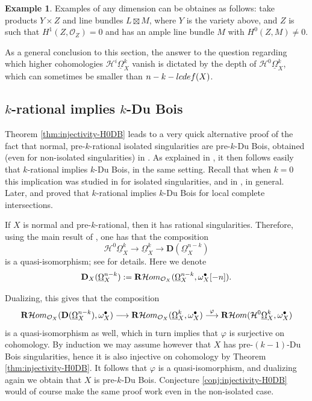 \documentclass[11pt]{amsart}
\theoremstyle{definition}
\newtheorem{example}[equation]{Example}
\theoremstyle{plain}
\renewcommand{\H}{\mathcal H}
\renewcommand{\O}{\mathcal O}
\newcommand{\PP}{\mathbb P}
\newcommand{\DD}{\mathbf D}
\newcommand{\RHom}{{\bf R} \H om}
\newcommand{\DB}{\underline{\Omega}} %
\begin{document}
\begin{example}
Examples of any dimension can be obtaines as follows: take products $Y \times Z$ and line bundles $L \boxtimes M$, where $Y$ is the variety above, and $Z$ is such that $H^1(Z, \O_Z) = 0$ and has an ample line bundle $M$ with $H^0 (Z, M) \neq 0$.

\medskip

As a general conclusion to this section, the answer to the question regarding which higher cohomologies $\H^i \DB_X^k$ vanish is dictated by the depth of $\H^0 \DB_X^k$, which can sometimes be smaller than $n - k - {\rm lcdef (X)}$.
\end{example}






\subsection{$k$-rational implies $k$-Du Bois}\label{scn:krat-kDB}
Theorem \ref{thm:injectivity-H0DB} leads to a very quick alternative proof of the fact that normal, pre-$k$-rational isolated singularities are pre-$k$-Du Bois, obtained (even for non-isolated singularities) in \cite[Theorem B]{SVV}. As explained in \cite[Corollary 5.8]{SVV}, it then follows easily that $k$-rational implies $k$-Du Bois, in the same setting. Recall that when $k = 0$ this implication was studied in  \cite[Proposition 3.7]{Steenbrink-isolated-rational-implies-DB} for isolated singularities, and in \cite{Kovacs-rational-implies-DB}, \cite{Saito-MHC} in general. Later, \cite[Theorem 1.6]{FL}  and \cite[Theorem B]{MP-lci}  proved that $k$-rational implies $k$-Du Bois for local complete intersections.

If  $X$ is normal and pre-$k$-rational, then it has rational singularities.  Therefore, using the main result of \cite{KS-extending}, one has that the composition
 \[\H^0\DB_X^k \to  \DB_X^k  \to  \DD (\DB_X^{n-k})\]
 is a quasi-isomorphism; see \cite[Remark 2.5]{SVV} for details. Here we denote 
 $$\DD_X (\DB_X^{n-k}) := \RHom_{\O_X}(\DB_X^{n-k},\omega_X^{\bullet}[-n]).$$

Dualizing, this gives that the 
composition
\[\RHom_{\O_X}( \DD (\DB_X^{n-k}),\omega_X^{\bullet})\longrightarrow \RHom_{\O_X}(\DB_X^k,\omega_X^{\bullet})\overset{\varphi}{\longrightarrow} \RHom(\H^0\DB^k_{X},\omega_X^{\bullet})\]
is a quasi-isomorphism as well, which in turn implies that $\varphi$ is surjective on cohomology. By induction we may assume however that $X$ has 
pre-$(k-1)$-Du Bois singularities, hence it is also injective on cohomology by Theorem \ref{thm:injectivity-H0DB}. It follows that $\varphi$ 
is a quasi-isomorphism, and dualizing again we obtain that $X$ is pre-$k$-Du Bois. Conjecture \ref{conj:injectivity-H0DB} would of course make the same proof work even in the non-isolated case.
\end{document}
